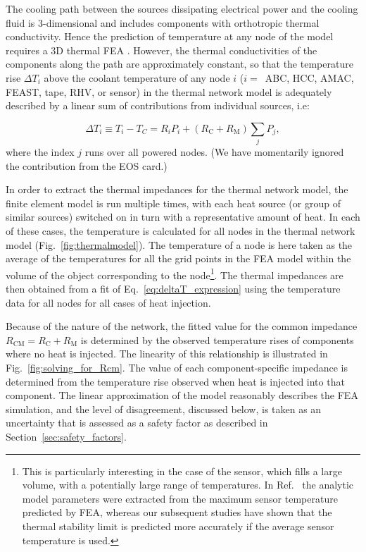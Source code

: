 \label{sec:impedances}

The cooling path between the sources dissipating electrical power and the cooling fluid is 3-dimensional and includes components with orthotropic thermal conductivity. Hence the prediction of temperature at any node of the model requires a 3D thermal FEA \cite{abaqus,ansys}. However, the thermal conductivities of the components along the path are approximately constant, so that the temperature rise $\Delta T_i$ above the coolant temperature of any node $i$ ($i=$~ABC, HCC, AMAC, FEAST, tape, RHV, or sensor) in the thermal network model is adequately described by a linear sum of contributions from individual sources, i.e:

\begin{equation}
\Delta T_i \equiv T_i - T_C = R_i P_i + \left(R_\text{C} + R_\text{M}\right)\sum_j P_j,
\label{eq:deltaT_expression}
\end{equation}
where the index $j$ runs over all powered nodes. (We have momentarily ignored the contribution from the EOS card.)

In order to extract the thermal impedances for the thermal network model, the finite element model is run multiple times, with each heat source (or group of similar sources) switched on in turn with a representative amount of heat. In each of these cases, the temperature is calculated for all nodes in the thermal network model (Fig.~\ref{fig:thermalmodel}). The temperature of a node is here taken as the average of the temperatures for all the grid points in the FEA model within the volume of the object corresponding to the node\footnote{This is particularly interesting in the case of the sensor, which fills a large volume, with a potentially large range of temperatures. In Ref.~\cite{Beck:2010zzd} the analytic model parameters were extracted from the maximum sensor temperature predicted by FEA, whereas our subsequent studies have shown that the thermal stability limit is predicted more accurately if the average sensor temperature is used.}. The thermal impedances are then obtained from a fit of Eq.~\ref{eq:deltaT_expression} using the temperature data for all nodes for all cases of heat injection.

Because of the nature of the network, the fitted value for the common impedance $R_\text{CM}=R_\text{C} + R_\text{M}$ is determined by the observed temperature rises of components where no heat is injected. The linearity of this relationship is illustrated in Fig.~\ref{fig:solving_for_Rcm}. The value of each component-specific impedance is determined from the temperature rise observed when heat is injected into that component. The linear approximation of the model reasonably describes the FEA simulation, and the level of disagreement, discussed below, is taken as an uncertainty that is assessed as a safety factor as described in Section~\ref{sec:safety_factors}.

